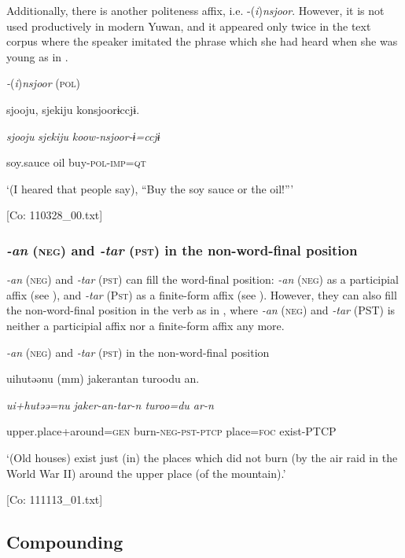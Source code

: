   Additionally, there is another politeness affix, i.e. -(\textit{i})\textit{nsjoor}. However, it is not used productively in modern Yuwan, and it appeared only twice in the text corpus where the speaker imitated the phrase which she had heard when she was young as in .

\ea\label{ex:8-144}
  \textit{{}-}(\textit{i})\textit{nsjoor} (\textsc{pol})

  {\TM}
\glll  {\textbar}sjooju,  sjekiju{\textbar}  konsjoorɨccjɨ.

    \textit{sjooju}  \textit{sjekiju}  \textit{koow-nsjoor{}-ɨ=ccjɨ}

    soy.sauce  oil  buy-\textsc{pol}-\textsc{imp}=\textsc{qt}

    ‘(I heared that people say), “Buy the soy sauce or the oil!”’

    [Co: 110328\_00.txt]
\z

\subsubsection{\textit{{}-an} (\textsc{neg}) and \textit{{}-tar} (\textsc{pst}) in the non-word-final position}

\textit{{}-an} (\textsc{neg}) and \textit{{}-tar} (\textsc{pst}) can fill the word-final position: \textit{{}-an} (\textsc{neg}) as a participial affix (see ), and \textit{{}-tar} (P\textsc{st}) as a finite-form affix (see ). However, they can also fill the non-word-final position in the verb as in , where \textit{{}-an} (\textsc{neg}) and \textit{{}-tar} (PST) is neither a participial affix nor a finite-form affix any more.

\ea\label{ex:8-145}
  \textit{{}-an} (\textsc{neg}) and \textit{-tar} (\textsc{pst}) in the non-word-final position

  {\TM}
\glll  uihutəənu  (mm)  {\textbar}jaker{\textbar}antan  turoodu  an.

    \textit{ui+hutəə=nu}    \textit{jaker-an-tar{}-n  turoo=du  ar-n}

    upper.place+around=\textsc{gen}    burn-\textsc{neg}-\textsc{pst}-\textsc{ptcp}  place=\textsc{foc}  exist-PTCP

    ‘(Old houses) exist just (in) the places which did not burn (by the air raid in the World War II) around the upper place (of the mountain).’

    [Co: 111113\_01.txt]
\z

\subsection{Compounding}
